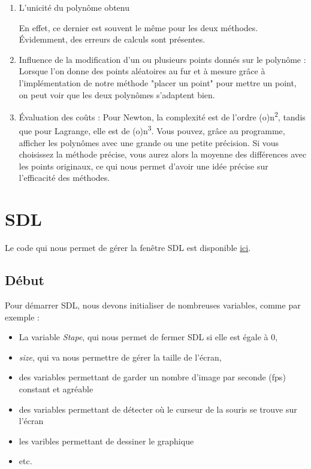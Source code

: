 \documentclass[letter]{article}
\begin{document}
\begin{enumerate}
\item L'unicité du polynôme obtenu

En effet, ce dernier est souvent le même pour les deux méthodes. Évidemment, des erreurs de calculs sont présentes.

\item Influence de la modification d'un ou plusieurs points donnés sur le polynôme :
Lorsque l'on donne des points aléatoires au fur et à mesure grâce à l'implémentation de notre méthode "placer un point" pour mettre un point, on peut voir que les deux polynômes s'adaptent bien.

\item Évaluation des coûts :
Pour Newton, la complexité est de l'ordre (o)n\textsuperscript{2}, tandis que pour Lagrange, elle est de (o)n\textsuperscript{3}. 
Vous pouvez, grâce au programme, afficher les polynômes avec une grande ou une petite précision. Si vous choisissez la méthode précise, vous aurez alors la moyenne des différences avec les points originaux, ce qui nous permet d'avoir une idée précise sur l’efficacité des méthodes.
\end{enumerate}

\newpage
\section{SDL}
\label{sec:orge1db78a}

Le code qui nous permet de gérer la fenêtre SDL est disponible \href{render.c}{ici}.

\subsection{Début}
\label{sec:orgfbd5f66}

Pour démarrer SDL, nous devons initialiser de nombreuses variables, comme par exemple :

\begin{itemize}
\item La variable \emph{Stape}, qui nous permet de fermer SDL si elle est égale à 0,
\item \emph{size}, qui va nous permettre de gérer la taille de l'écran,
\item des variables permettant de garder un nombre d'image par seconde (fps) constant et agréable
\item des variables permettant de détecter où le curseur de la souris se trouve sur l'écran
\item les varibles permettant de dessiner le graphique
\item etc.
\end{itemize}
\end{document}
